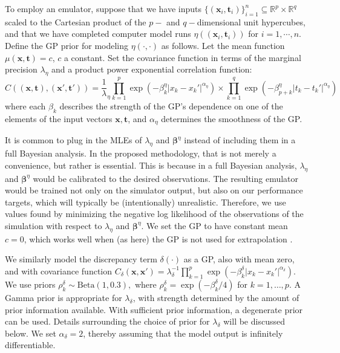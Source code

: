 \documentclass[12pt]{article}
\begin{document}
To employ an emulator, suppose that we have inputs $\{(\mathbf x_i,\mathbf t_i)\}_{i=1}^n\subseteq \mathbb R^p\times \mathbb R^q$ scaled to the Cartesian product of the $p-$ and $q-$dimensional unit hypercubes, and that we have completed computer model runs 
%
$\eta\left((\mathbf x_i,\mathbf t_i)\right)$ for $i=1,\cdots,n.$
%
Define the GP prior for modeling $\eta(\cdot,\cdot)$ as follows. 
%
Let the mean function $\mu(\mathbf x,\mathbf t)=c$, $c$ a constant. 
%
Set the covariance function in terms of the marginal precision $\lambda_\eta$ and a product power exponential correlation function:
%
\begin{equation}\label{eq:Hig_cov}
C((\mathbf x,\mathbf t),(\mathbf x',\mathbf t')) = \frac 1\lambda_\eta \prod_{k=1}^{p}
\exp \left(-\beta^\eta_k|x_k-x_k'|^{\alpha_\eta}\right) \times
\prod_{k=1}^{q}
\exp \left(-\beta^\eta_{p+k}|t_k-t_k'|^{\alpha_\eta}\right)
\end{equation}
%
where each $\beta_k$ describes the strength of the GP's dependence on one of the elements of the input vectors $\mathbf x,\mathbf t$, and $\alpha_\eta$ determines the smoothness of the GP. 

It is common to plug in the MLEs of $\lambda_\eta$ and $\boldsymbol \beta^\eta$ instead of including them in a full Bayesian analysis.
%
In the proposed methodology, that is not merely a convenience, but rather is essential.
%
This is because in a full Bayesian analysis, $\lambda_\eta$ and $\boldsymbol\beta^\eta$ would be calibrated to the desired observations.
%
The resulting emulator would be trained not only on the simulator output, but also on our performance targets, which will typically be (intentionally) unrealistic.
%
Therefore, we use values found by minimizing the negative log likelihood of the observations of the simulation with respect to $\lambda_\eta$ and $\boldsymbol\beta^\eta$.
%
We set the GP to have constant mean $c=0$, which works well when (as here) the GP is not used for extrapolation \citep{Bayarri2007}.
%

We similarly model the discrepancy term $\delta(\cdot)$ as a GP, also with mean zero, and with covariance function
%
$C_\delta(\mathbf x,\mathbf x') = \lambda_\delta^{-1} \prod_{k=1}^p
\exp\left( -\beta_k^\delta |x_k-x_k'|^{\alpha_\delta} \right).$
%
We use priors
$\rho^\delta_k \sim \mathrm{Beta}(1,0.3),$
where $\rho_k^\delta = \exp(-\beta_k^\delta/4)$ for $k=1,\ldots,p$. 
%
A Gamma prior is appropriate for $\lambda_\delta$, with strength determined by the amount of prior information available. 
%
With sufficient prior information, a degenerate prior can be used. 
%
Details surrounding the choice of prior for $\lambda_\delta$ will be discussed below.
%
We set $\alpha_\delta=2$, thereby assuming that the model output is infinitely differentiable.
\end{document}
